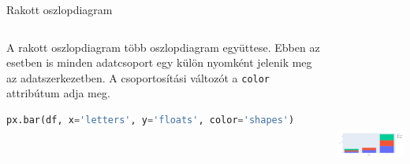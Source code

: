 \documentclass[english, aspectratio=169]{beamer}
\begin{document}
\begin{frame}[fragile]{Rakott oszlopdiagram}
	\begin{columns}
		\begin{column}{.5\textwidth}
			A rakott oszlopdiagram több oszlopdiagram együttese. Ebben az esetben is minden adatcsoport egy külön nyomként jelenik meg az adatszerkezetben. A csoportosítási változót a \texttt{color} attribútum adja meg. 
			\vspace{0.3cm}
			\begin{lstlisting}[language=python]
px.bar(df, x='letters', y='floats', color='shapes')
			\end{lstlisting}
		\end{column}
		\begin{column}{.5\textwidth}
			\begin{center}
				\includegraphics[width=7cm, height=7cm, keepaspectratio]{images/plots_11.png}
			\end{center}
		\end{column}
	\end{columns}
\end{frame}
\end{document}
